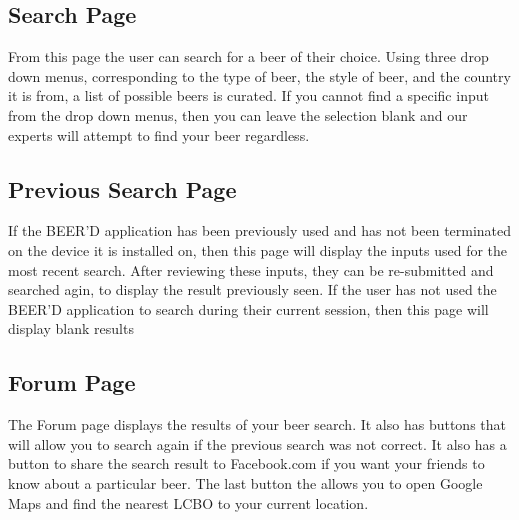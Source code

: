 \documentclass[]{article}
\begin{document}
\subsection{Search Page}
\label{sec:search_page}
From this page the user can search for a beer of their choice. Using three drop down menus, corresponding to the type of beer, the style of beer, and the country it is from, a list of possible beers is curated. If you cannot find a specific input from the drop down menus, then you can leave the selection blank and our experts will attempt to find your beer regardless.

\subsection{Previous Search Page}
\label{sec:search_page}
If the BEER'D application has been previously used and has not been terminated on the device it is installed on, then this page will display the inputs used for the most recent search. After reviewing these inputs, they can be re-submitted and searched agin, to display the result previously seen. If the user has not used the BEER'D application to search during their current session, then this page will display blank results

\subsection{Forum Page}
\label{sec:forum_page}
The Forum page displays the results of your beer search. It also has buttons that will allow you to search again if the previous 
search was not correct. It also has a button to share the search result to Facebook.com if you want your friends to know about
a particular beer. The last button the allows you to open Google Maps and find the nearest LCBO to your current location. 







\newpage
\appendix
\end{document}
